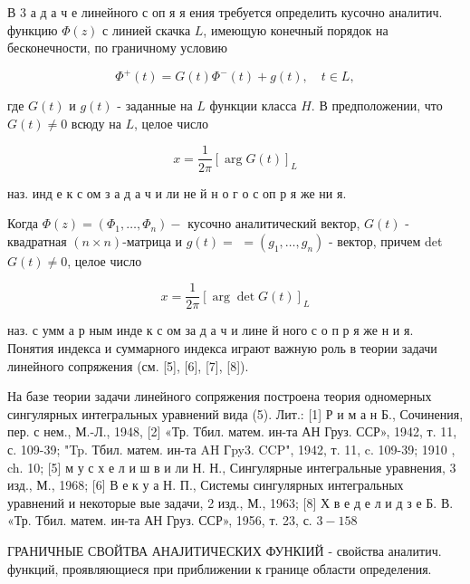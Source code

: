 \documentclass[10pt]{article}
\begin{document}
В 3 а д а ч е линейного с оп я я ения требуется определить кусочно аналитич. функцию $\Phi(z)$ с линией скачка $L$, имеющую конечный порядок на бесконечности, по граничному условию



\[

\Phi^{+}(t)=G(t) \Phi^{-}(t)+g(t), \quad t \in L,

\]



где $G(t)$ и $g(t)$ - заданные на $L$ функции класса $H$. В предположении, что $G(t) \neq 0$ всюду на $L$, целое число



\[

x=\frac{1}{2 \pi}[\arg G(t)]_{L}

\]



наз. инд е к с ом з а д а ч и ли не й н о г о с оп р я же ни я.



Когда $\Phi(z)=\left(\Phi_{1}, \ldots, \Phi_{n}\right)-$ кусочно аналитический вектор, $G(t)$ - квадратная $(n \times n)$-матрица и $g(t)=$ $=\left(g_{1}, \ldots, g_{n}\right)$ - вектор, причем det $G(t) \neq 0$, целое число



\[

x=\frac{1}{2 \pi}[\arg \operatorname{det} G(t)]_{L}

\]



наз. с умм а р ным инде к с ом за д а ч и лине й ного с о п р я же н и я. Понятия индекса и суммарного индекса играют важную роль в теории задачи линейного сопряжения (см. [5], [6], [7], [8]).



На базе теории задачи линейного сопряжения построена теория одномерных сингулярных интегральных уравнений вида (5). Лит.: [1] Р и м а н Б., Сочинения, пер. с нем., М.-Л., 1948, [2] «Тр. Тбил. матем. ин-та АН Груз. ССР», 1942, т. 11, с. 109-39; "Tp. Тбил. матем. ин-та AH Гpy3. CCP", 1942, т. 11, c. 109-39; 1910 , ch. 10; [5] м у с х е л и ш в и ли Н. Н., Сингулярные интегральные уравнения, 3 изд., М., 1968; [6] В е к у а Н. П., Системы сингулярных интегральных уравнений и некоторые вые задачи, 2 изд., М., 1963; [8] Х в е д е л и д з е Б. В. «Тр. Тбил. матем. ин-та АН Груз. ССР», 1956, т. 23, с. $3-158$



ГРАНИЧНЫЕ СВОЙТВА АНАЈИТИЧЕСКИХ ФУНКІИЙ - свойства аналитич. функций, проявляющиеся при приближении к границе области определения.
\end{document}
